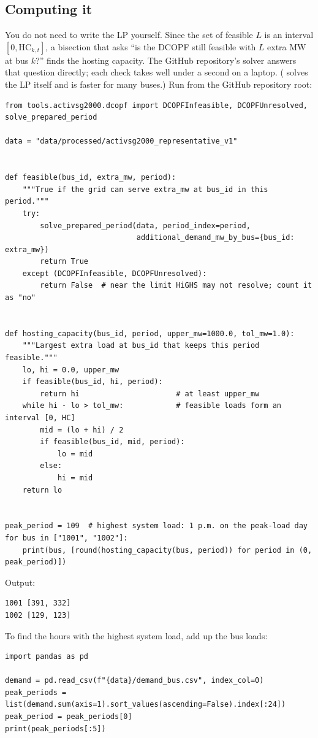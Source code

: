 \documentclass[10pt]{article}
\newcommand{\code}[1]{\path{#1}}
\begin{document}
\subsection{Computing it}
You do not need to write the LP yourself. Since the set of feasible $L$ is an
interval $[0, \mathrm{HC}_{k,t}]$, a bisection that asks ``is the DCOPF still
feasible with $L$ extra MW at bus $k$?'' finds the hosting capacity. The
GitHub repository's solver answers that question directly; each check takes
well under a second on a laptop. (\code{ercot-game-hosting-capacity} solves the
LP itself and is faster for many buses.) Run from the GitHub repository root:
\begin{lstlisting}[language=tutorialpython]
from tools.activsg2000.dcopf import DCOPFInfeasible, DCOPFUnresolved, solve_prepared_period

data = "data/processed/activsg2000_representative_v1"


def feasible(bus_id, extra_mw, period):
    """True if the grid can serve extra_mw at bus_id in this period."""
    try:
        solve_prepared_period(data, period_index=period,
                              additional_demand_mw_by_bus={bus_id: extra_mw})
        return True
    except (DCOPFInfeasible, DCOPFUnresolved):
        return False  # near the limit HiGHS may not resolve; count it as "no"


def hosting_capacity(bus_id, period, upper_mw=1000.0, tol_mw=1.0):
    """Largest extra load at bus_id that keeps this period feasible."""
    lo, hi = 0.0, upper_mw
    if feasible(bus_id, hi, period):
        return hi                      # at least upper_mw
    while hi - lo > tol_mw:            # feasible loads form an interval [0, HC]
        mid = (lo + hi) / 2
        if feasible(bus_id, mid, period):
            lo = mid
        else:
            hi = mid
    return lo


peak_period = 109  # highest system load: 1 p.m. on the peak-load day
for bus in ["1001", "1002"]:
    print(bus, [round(hosting_capacity(bus, period)) for period in (0, peak_period)])
\end{lstlisting}
Output:
\begin{lstlisting}
1001 [391, 332]
1002 [129, 123]
\end{lstlisting}

To find the hours with the highest system load, add up the bus loads:
\begin{lstlisting}[language=tutorialpython]
import pandas as pd

demand = pd.read_csv(f"{data}/demand_bus.csv", index_col=0)
peak_periods = list(demand.sum(axis=1).sort_values(ascending=False).index[:24])
peak_period = peak_periods[0]
print(peak_periods[:5])
\end{lstlisting}
\end{document}
